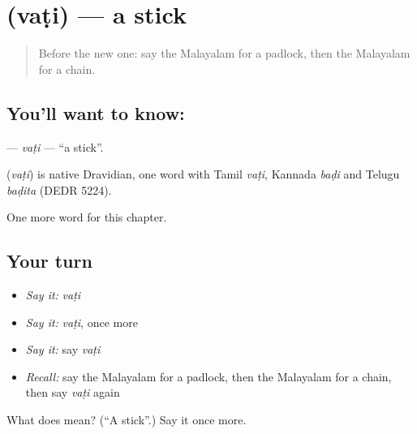 \section[\texorpdfstring{\ml{വടി} (vaṭi)}{വടി (vaṭi)}]{ (vaṭi) — a stick}

\label{lesson:ML-C294-vati}



\begin{quote}
Before the new one: say the Malayalam for a padlock, then the Malayalam for a chain.
\end{quote}

\subsection*{You'll want to know: }
\textbf{} — \emph{vaṭi} — \textquotedblleft{}a stick\textquotedblright{}.

\begin{cousinweb}
\textbf{} (\emph{vaṭi}) is native Dravidian, one word with Tamil \emph{vaṭi}, Kannada \emph{baḍi} and Telugu \emph{baḍita} (DEDR 5224).
\end{cousinweb}

\begin{grammarlens}[title={What you've built}]
One more word for this chapter.
\end{grammarlens}

\subsection*{Your turn}
\begin{itemize}
\raggedright
  \item \emph{Say it:} \emph{vaṭi}
  \item \emph{Say it:} \emph{vaṭi}, once more
  \item \emph{Say it:} say \emph{vaṭi}
  \item \emph{Recall:} say the Malayalam for a padlock, then the Malayalam for a chain, then say \emph{vaṭi} again
\end{itemize}

\begin{tcolorbox}[breakable,colback=teal!4,colframe=teal!35!black,title={Before you move on}]
What does  mean? (\textquotedblleft{}A stick\textquotedblright{}.) Say it once more.
\end{tcolorbox}
